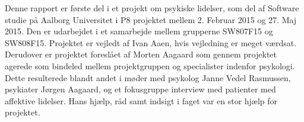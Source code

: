 Denne rapport er første del i et projekt om psykiske lidelser, som del af Software studie på Aalborg Universitet i P8 projektet mellem 2. Februar 2015 og 27. Maj 2015. 
Den er udarbejdet i et samarbejde mellem grupperne SW807F15 og SW808F15.
Projektet er vejledt af Ivan Aaen, hvis vejledning er meget værdsat.
Derudover er projektet foreslået af Morten Aagaard som gennem projektet agerede som bindeled mellem projektgruppen og specialister indenfor psykologi. Dette resulterede blandt andet i møder med psykolog Janne Vedel Rasmussen, psykiater Jørgen Aagaard, og et fokusgruppe interview med patienter med affektive lidelser. Hans hjælp, råd samt indsigt i faget var en stor hjælp for projektet.